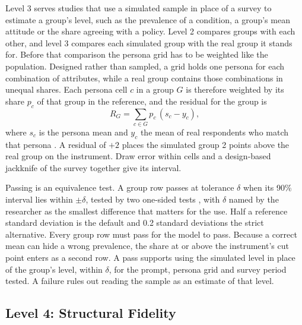 Level 3 serves studies that use a simulated sample in place of a survey to estimate a group's level, such as the prevalence of a condition, a group's mean attitude or the share agreeing with a policy.
Level 2 compares groups with each other, and level 3 compares each simulated group with the real group it stands for.
Before that comparison the persona grid has to be weighted like the population.
Designed rather than sampled, a grid holds one persona for each combination of attributes, while a real group contains those combinations in unequal shares.
Each persona cell $c$ in a group $G$ is therefore weighted by its share $p_c$ of that group in the reference, and the residual for the group is
\begin{equation}
R_G = \sum_{c \in G} p_c\,(s_c - y_c),
\end{equation}
where $s_c$ is the persona mean and $y_c$ the mean of real respondents who match that persona \citep{holtsmith1979poststrat}.
A residual of $+2$ places the simulated group 2 points above the real group on the instrument.
Draw error within cells and a design-based jackknife of the survey together give its interval.

Passing is an equivalence test.
A group row passes at tolerance $\delta$ when its 90\% interval lies within $\pm\delta$, tested by two one-sided tests \citep{schuirmann1987tost,lakens2018tutorial}, with $\delta$ named by the researcher as the smallest difference that matters for the use.
Half a reference standard deviation is the default and 0.2 standard deviations the strict alternative.
Every group row must pass for the model to pass.
Because a correct mean can hide a wrong prevalence, the share at or above the instrument's cut point enters as a second row.
A pass supports using the simulated level in place of the group's level, within $\delta$, for the prompt, persona grid and survey period tested.
A failure rules out reading the sample as an estimate of that level.

\subsection{Level 4: Structural Fidelity}
\label{sec:l4-method}

